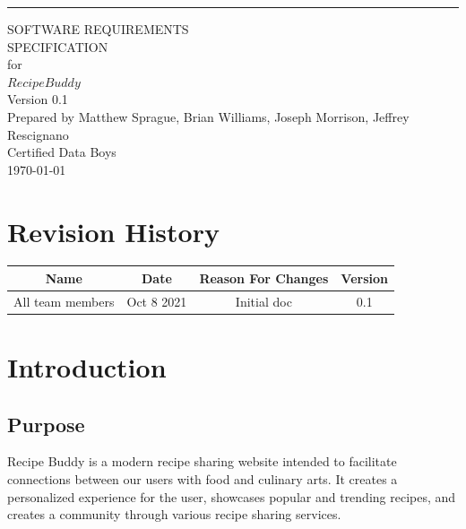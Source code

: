 \documentclass{scrreprt}
\def\myversion{0.1}
\begin{document}
\begin{flushright}
    \rule{16cm}{5pt}\vskip1cm
    \begin{bfseries}
        \Huge{SOFTWARE REQUIREMENTS\\ SPECIFICATION}\\
        \vspace{1.85cm}
        for\\
        \vspace{1.85cm}
        $Recipe Buddy$\\
        \vspace{1.8cm}
        \LARGE{Version \myversion}\\
        \vspace{1.8cm}
        Prepared by $ $Matthew Sprague, Brian Williams, Joseph Morrison, Jeffrey Rescignano$ $\\
        \vspace{1.8cm}
        $ $Certified Data Boys$ $\\
        \vspace{1.8cm}
        \today\\
    \end{bfseries}
\end{flushright}

\tableofcontents

\chapter*{Revision History}\label{revisions}

\begin{center}
    \begin{tabular}{c c c c}
        \midrule
        Name & Date        & Reason For Changes & Version \\
        \midrule
        All team members & Oct 8 2021 & Initial doc        & 0.1     \\
        \midrule
    \end{tabular}
\end{center}

\chapter{Introduction}

\section{Purpose}
$ $Recipe Buddy is a modern recipe sharing website intended to facilitate connections between our users with food and culinary arts.
It creates a personalized experience for the user, showcases popular and trending recipes, and creates a community through various recipe sharing services.$ $
\end{document}
